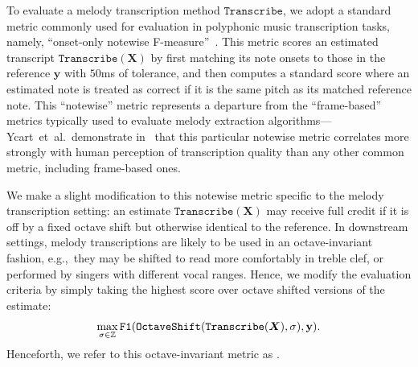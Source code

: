 To evaluate a melody transcription method $\texttt{Transcribe}$, 
we adopt a standard metric commonly used for evaluation in polyphonic music transcription tasks, namely,  ``onset-only notewise F-measure''~\cite{ycart2020investigating}. 
This metric scores an estimated transcript $\texttt{Transcribe}(\bm{X})$ by first matching its note onsets to those in the reference $\bm{y}$ with $50$ms of tolerance, and then computes a standard \fone{} score where an estimated note is treated as correct if it is the same pitch as its matched reference note. 
This ``notewise'' metric represents a departure from the ``frame-based'' metrics typically used to evaluate melody extraction algorithms---Ycart~et~al.\ demonstrate in~\cite{ycart2020investigating} that this particular notewise metric correlates more strongly with human perception of transcription quality than any other common metric, including frame-based ones.

We make a slight modification to this notewise metric 
specific to 
the melody transcription setting: an estimate $\texttt{Transcribe}(\bm{X})$ may receive full credit if it is off by a fixed octave shift but otherwise identical to the reference. 
In downstream settings, melody transcriptions are likely to be used in an octave-invariant fashion, e.g.,~they may be shifted to read more comfortably in treble clef, or performed by singers with different vocal ranges. 
Hence, we modify the evaluation criteria by simply taking the highest score over octave shifted versions of the estimate:
\begin{equation*}
    \max_{\sigma \in \mathbb{Z}} \texttt{\texttt{F1}}(\texttt{OctaveShift}(\texttt{Transcribe}(\mbox{\boldmath{$X$}}), \sigma), \mathbf{y}).
\end{equation*}
Henceforth, we refer to this octave-invariant metric as \fone. 